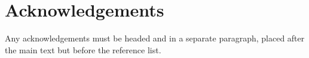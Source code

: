 \documentclass{article}
\begin{document}
\section*{Acknowledgements}

Any acknowledgements must be headed and in a separate paragraph,
placed after the main text but before the reference list.




%
%
%
%
\end{document}
